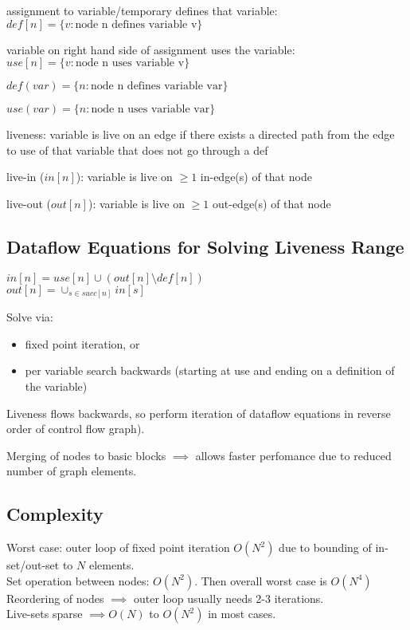 \documentclass[8pt]{extarticle}
\begin{document}
\begin{multicols*}{2}
  assignment to variable/temporary defines that variable:\\
  $def[n]=\{v:\text{node n defines variable v}\}$

  variable on right hand side of assignment uses the variable:\\
  $use[n]=\{v: \text{node n uses variable v}\}$
  
  $def(var)=\{n: \text{node n defines variable var}\}$

  $use(var)=\{n: \text{node n uses variable var}\}$

  liveness: variable is live on an edge if there exists a directed path from the edge to use of that variable that does not go through a def

  live-in ($in[n]$): variable is live on $\geq 1$ in-edge(s) of that node

  live-out ($out[n]$): variable is live on $\geq1$ out-edge(s) of that node

  \subsection{Dataflow Equations for Solving Liveness Range}
  
  $in[n]=use[n] \cup (out[n] \setminus def[n])$\\
  $out[n]=\cup_{s\in succ[n]} in[s]$

  Solve via:
  \begin{itemize}
  \item fixed point iteration, or
  \item per variable search backwards (starting at use and ending on a definition of the variable)
  \end{itemize}
  
  Liveness flows backwards, so perform iteration of dataflow equations in reverse order of control flow graph).

  Merging of nodes to basic blocks $\implies$ allows faster perfomance due to reduced number of graph elements.

  \subsection{Complexity}
  Worst case: outer loop of fixed point iteration $O(N^2)$ due to bounding of in-set/out-set to $N$ elements.\\
  Set operation between nodes: $O(N^2)$. Then overall worst case is $O(N^4)$\\
  Reordering of nodes $\implies$ outer loop usually needs 2-3 iterations.\\
  Live-sets sparse $\implies O(N)$ to $O(N^2)$ in most cases.


\end{multicols*}
\end{document}
